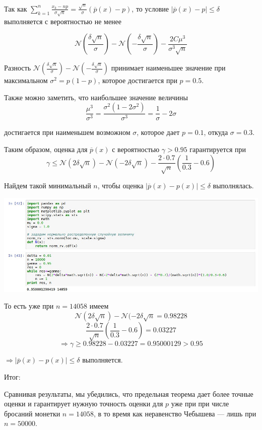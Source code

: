 \documentclass[a4paper,12pt]{article}
\newcommand{\lt}{\left}
\newcommand{\rt}{\right}
\newcommand{\fr}{\frac}
\newcommand{\ol}{\overline}
\newcommand{\mc}{\mathcal}
\newcommand{\sg}{\sigma}
\begin{document}
\begin{enumerate}
\begin{enumerate}
Так как $\sum\limits_{k = 1}^{n}\fr{x_k - np}{\sigma\sqrt{n}} = \fr{\sqrt{n}}{\sigma}({\ol p(x) - p})$, то условие $|{\ol p(x)} - p|\leqslant \delta$ выполняется с вероятностью не менее

$$\mathcal{N}\lt(\fr{\delta\sqrt{n}}{\sigma}\rt) - \mc{N}\lt(-\fr{\delta\sqrt{n}}{\sigma}\rt) - \fr{2C\mu^3}{\sigma^3\sqrt{n}}$$

Разность $\mathcal{N}\lt(\fr{\delta\sqrt{n}}{\sigma}\rt) - \mc{N}\lt(-\fr{\delta\sqrt{n}}{\sigma}\rt)$ принимает наименьшее значение при максимальном $\sigma^2 = p(1-p)$, которое достигается при 	$p = 0.5$.

Также можно заметить, что наибольшее значение величины
$$\fr{\mu^3}{\sigma^3} = \fr{\sigma^2(1 - 2\sigma^2)}{\sg^3} = \fr{1}{\sg} - 2\sg$$ 

достигается при наименьшем возможном $\sg$, которое дает $p = 0.1$, откуда $\sg = 0.3$.

Таким образом, оценка для ${\ol p(x)}$ с вероятностью $\gamma > 0.95$ гарантируется при
$$\gamma \leqslant \mc{N}(2\delta\sqrt{n}) -  \mc{N}(-2\delta\sqrt{n}) - \fr{2\cdot0.7}{\sqrt{n}}\lt(\fr{1}{0.3} - 0.6\rt)$$

Найдем такой минимальный $n$, чтобы оценка $|{\ol p(x)} - p(x)|\leqslant \delta$ выполнялась.

\includegraphics[width=\linewidth]{python.jpg}

То есть уже при $n = 14058$ имеем 
$$\mc{N}(2\delta\sqrt{n}) -  \mc{N}(-2\delta\sqrt{n} = 0.98228$$
$$\fr{2\cdot0.7}{\sqrt{n}}\lt(\fr{1}{0.3} - 0.6\rt) = 0.03227$$
$$\Rightarrow \gamma \geqslant 0.98228 - 0.03227 = 0.95000129 > 0.95 $$

$\Rightarrow |{\ol p(x)} - p(x)|\leqslant \delta$ выполняется.

Итог:

Сравнивая результаты, мы убедились, что предельная теорема дает более точные оценки и гарантирует нужную точность оценки для $p$ уже при при числе бросаний монетки $n = 14058$, в то время как
неравенство Чебышева — лишь при $n = 50000$.

	

\end{enumerate}
\end{enumerate}
\end{document}
